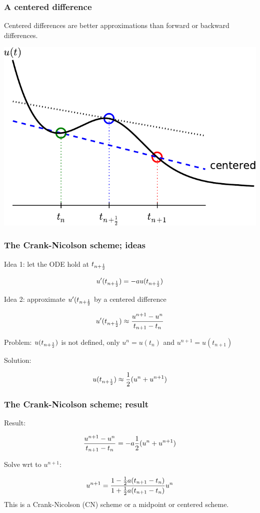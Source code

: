 \documentclass{beamer}
\begin{document}
\begin{frame}
\frametitle{A centered difference}

Centered differences are better approximations than forward or
backward differences.



\centerline{\includegraphics[width=0.8\linewidth]{fig-alg/fd_centered_CN.pdf}}
\end{frame}

\begin{frame}
\frametitle{The Crank-Nicolson scheme; ideas}

\label{decay:schemes:CN}


Idea 1: let the ODE hold at $t_{n+\frac{1}{2}}$

\[ u'(t_{n+\frac{1}{2}}) = -au(t_{n+\frac{1}{2}})\]

Idea 2: approximate $u'(t_{n+\frac{1}{2}}$ by a centered difference

\begin{equation}
u'(t_{n+\frac{1}{2}}) \approx \frac{u^{n+1}-u^n}{t_{n+1}-t_n}
\label{decay:CNdiff}
\end{equation}

Problem: $u(t_{n+\frac{1}{2}})$ is not defined, only $u^n=u(t_n)$ and $u^{n+1}=u(t_{n+1})$

Solution:

\[ u(t_{n+\frac{1}{2}}) \approx \frac{1}{2}(u^n + u^{n+1}) \]
\end{frame}

\begin{frame}
\frametitle{The Crank-Nicolson scheme; result}

Result:

\begin{equation}
\frac{u^{n+1}-u^n}{t_{n+1}-t_n} = -a\frac{1}{2} (u^n + u^{n+1})
\label{decay:CN1}
\end{equation}

Solve wrt to $u^{n+1}$:

\begin{equation}
u^{n+1} = \frac{1-\frac{1}{2} a(t_{n+1}-t_n)}{1 + \frac{1}{2} a(t_{n+1}-t_n)}u^n
\label{decay:CN}
\end{equation}
This is a Crank-Nicolson (CN) scheme or a midpoint or centered scheme.
\end{frame}
\end{document}
